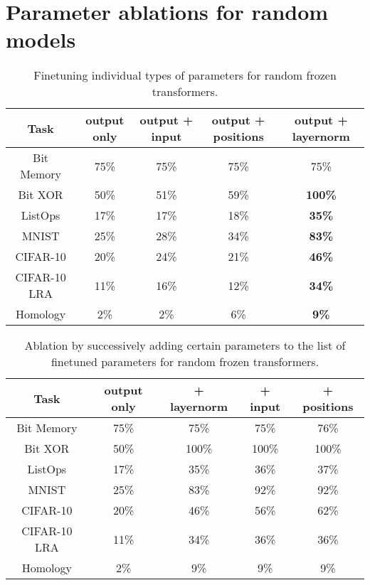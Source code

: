 \section*{Parameter ablations for random models}

\begin{table}[H] 
\begin{center}
\begin{tabular}{c|cccc}
\toprule
\textbf{Task} & \multicolumn{1}{c}{\bf output only} & \multicolumn{1}{c}{\bf output + input} & \multicolumn{1}{c}{\bf output + positions} & \multicolumn{1}{c}{\bf output + layernorm} \\
\midrule
Bit Memory & 75\% & 75\% & 75\% & 75\% \\
Bit XOR & 50\% & 51\% & 59\% & \textbf{100\%} \\
ListOps & 17\% & 17\% & 18\% & \textbf{35\%} \\
MNIST & 25\% & 28\% & 34\% & \textbf{83\%} \\
CIFAR-10 & 20\% & 24\% & 21\% & \textbf{46\%} \\
CIFAR-10 LRA & 11\% & 16\% & 12\% & \textbf{34\%} \\
Homology & 2\% &  2\% &  6\% & \textbf{9\%} \\
\bottomrule
\end{tabular}
\end{center}
\caption{Finetuning individual types of parameters for random frozen transformers.}\label{table:finetuning_random_indep}
\end{table}

\begin{table}[H]
\begin{center}
\begin{tabular}{c|cccc}
\toprule
\textbf{Task} & \multicolumn{1}{c}{\bf output only} & \multicolumn{1}{c}{\bf + layernorm} & \multicolumn{1}{c}{\bf + input} & \multicolumn{1}{c}{\bf + positions} \\
\midrule
Bit Memory & 75\% & 75\% & 75\% & 76\% \\
Bit XOR & 50\% & 100\% & 100\% & 100\% \\
ListOps & 17\% & 35\% & 36\% & 37\% \\
MNIST & 25\% & 83\% & 92\% & 92\% \\
CIFAR-10 & 20\% & 46\% & 56\% & 62\% \\
CIFAR-10 LRA & 11\% & 34\% & 36\% & 36\% \\
Homology & 2\% & 9\%  & 9\% & 9\% \\
\bottomrule
\end{tabular}
\end{center}
\caption{Ablation by successively adding certain parameters to the list of finetuned parameters for random frozen transformers.}\label{table:finetuning_random_add}
\end{table}
